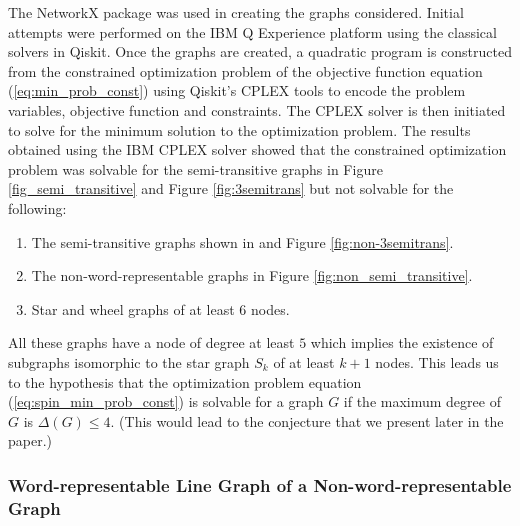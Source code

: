 \documentclass{article}
\begin{document}
The NetworkX package was used in creating the graphs considered. Initial attempts were performed on the IBM Q Experience \cite{Q_Experience} platform using the classical solvers in Qiskit. Once the graphs are created, a quadratic program is constructed from the constrained optimization problem of the objective function equation (\ref{eq:min_prob_const}) using Qiskit's CPLEX tools to encode the problem variables, objective function and constraints. The CPLEX solver is then initiated to solve for the minimum solution to the optimization problem. The results obtained using the IBM CPLEX solver showed that the constrained optimization problem was solvable for the semi-transitive graphs in Figure \ref{fig_semi_transitive}  and Figure \ref{fig:3semitrans} 
but not solvable for the following:
\begin{enumerate}
    \item The semi-transitive graphs 
    shown in \cite{SMT2019} and Figure \ref{fig:non-3semitrans}.
    \item The non-word-representable graphs in Figure \ref{fig:non_semi_transitive}. 
    \item Star and wheel graphs of at least $6$ nodes.
\end{enumerate} 
All these graphs have a node of degree at least $5$ which implies the existence of subgraphs isomorphic to the star graph $S_{k}$ of at least $k+1$ nodes. This leads us to the hypothesis that the optimization problem equation (\ref{eq:spin_min_prob_const}) is solvable for a graph $G$ if the maximum degree of $G$ is $\Delta (G)\leq 4$. (This would lead to the conjecture that we present later in the paper.)

\subsubsection*{Word-representable Line Graph of a Non-word-representable Graph}
\end{document}
